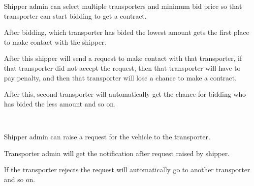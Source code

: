 \documentclass[]{deedy-resume-openfont}
\begin{document}
\begin{minipage}[t]{0.56\textwidth}
\begin{tightemize}
\item Shipper admin can select multiple transporters and minimum bid price so that transporter can start bidding to get a contract.
\item After bidding, which transporter has bided the lowest amount gets the first place to make contact with the shipper.
\item After this shipper will send a request to make contact with that transporter, if that transporter did not accept the request, then that transporter will have to pay penalty, and then that transporter will lose a chance to make a contract.
\item After this, second transporter will automatically get the chance for bidding who has bided the less amount and so on.
\end{tightemize}
\ \ \ \ \ \ 
\sectionsep

\descript{}
\begin{tightemize}
\item Shipper admin can raise a request for the vehicle to the transporter.
\item Transporter admin will get the notification after request raised by shipper.
\item If the transporter rejects the request will automatically go to another transporter and so on.
\end{tightemize}

\ \ \ \ \ \ 



\sectionsep

%
%

\end{minipage} 
\end{document}
